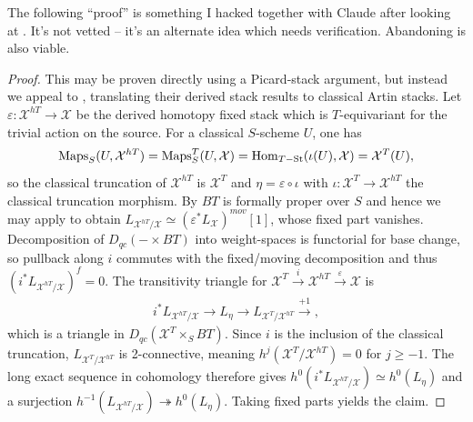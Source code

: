 \documentclass[12pt,dvipsnames]{amsart}
\newcommand{\red}[1]{\textcolor{Mahogany}{#1}}
\begin{document}
\red{The following ``proof'' is something I hacked together with Claude after looking at \cite[Corollary A.31]{aranha-khan-latyntsev-etal_VirtualLocalizationRevisited2025}. It's not vetted -- it's an alternate idea which needs verification. Abandoning is also viable.}
\begin{proof}
  This may be proven directly using a Picard-stack argument, but instead we appeal to \cite[Cor. A.31]{aranha-khan-latyntsev-etal_VirtualLocalizationRevisited2025}, translating their derived stack results to classical Artin stacks.
  Let \(\varepsilon:\mathcal X^{hT}\to \mathcal X\) be the derived homotopy fixed stack \cite[Def. A.14, Rem A.15]{aranha-khan-latyntsev-etal_VirtualLocalizationRevisited2025} which is \(T\)-equivariant for the trivial action on the source. For a classical \(S\)-scheme \(U\), one has
  \begin{align*}
    \operatorname{Maps}_S(U,\mathcal X^{hT}) = \operatorname{Maps}_S^T(U, \mathcal X) = \operatorname{Hom}_{T-\operatorname{St}}(\iota(U), \mathcal X) = \mathcal X^T(U),
  \end{align*}
  so the classical truncation of \(\mathcal X^{hT}\) is \(\mathcal X^T\) and \(\eta = \varepsilon \circ \iota\) with \(\iota:\mathcal X^T\to \mathcal X^{hT}\) the classical truncation morphism. By \cite[Rem. A.19]{aranha-khan-latyntsev-etal_VirtualLocalizationRevisited2025} \(BT\) is formally proper over \(S\) and hence we may apply \cite[Cor. A.31]{aranha-khan-latyntsev-etal_VirtualLocalizationRevisited2025} to obtain \(L_{\mathcal X^{hT}/\mathcal X}\simeq (\varepsilon^*L_{\mathcal X})^{mov}[1]\), whose fixed part vanishes. Decomposition of \(D_{qc}(-\times BT)\) into weight-spaces is functorial for base change, so pullback along \(i\) commutes with the fixed/moving decomposition and thus \((i^*L_{\mathcal X^{hT}/\mathcal X})^{f} = 0\). The transitivity triangle for \(\mathcal X^T\xrightarrow{i}\mathcal X^{hT}\xrightarrow{\varepsilon}\mathcal X\) is
  \begin{align*}
    i^*L_{\mathcal X^{hT}/\mathcal X} \to L_\eta \to L_{\mathcal X^T/\mathcal X^{hT}} \xrightarrow{+1},
  \end{align*}
  which is a triangle in \(D_{qc}(\mathcal X^{T}\times_SBT)\). Since \(i\) is the inclusion of the classical truncation, \(L_{\mathcal X^T/\mathcal X^{hT}}\) is 2-connective, meaning \(h^j(\mathcal X^T/\mathcal X^{hT}) = 0\) for \(j \geq -1\). The long exact sequence in cohomology therefore gives \(h^0(i^*L_{\mathcal X^{hT}/\mathcal X}) \simeq h^0(L_\eta)\) and a surjection \(h^{-1}(L_{\mathcal X^{hT}/\mathcal X}) \twoheadrightarrow h^0(L_\eta)\). Taking fixed parts yields the claim.
\end{proof}
\end{document}
